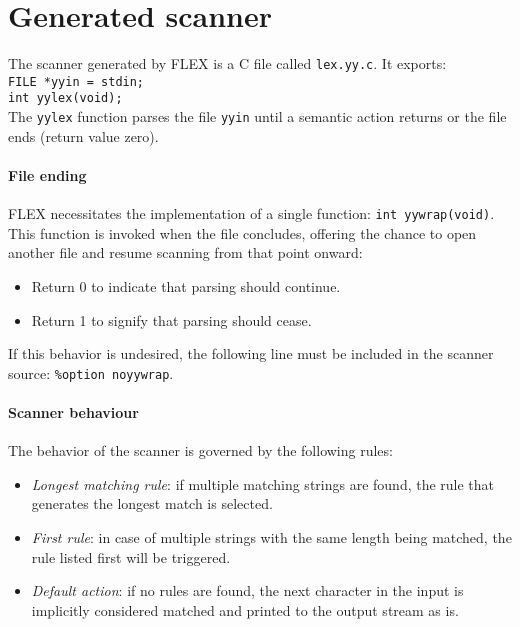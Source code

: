 \section{Generated scanner}

The scanner generated by FLEX is a C file called \texttt{lex.yy.c}. 
It exports: \\ 
\texttt{FILE *yyin = stdin;} \\
\texttt{int yylex(void);} \\
The \texttt{yylex} function parses the file \texttt{yyin} until a semantic action returns or the file ends (return value zero). 

\paragraph*{File ending}
FLEX necessitates the implementation of a single function: \texttt{int yywrap(void)}. 
This function is invoked when the file concludes, offering the chance to open another file and resume scanning from that point onward: 
\begin{itemize}
    \item Return 0 to indicate that parsing should continue.
    \item Return 1 to signify that parsing should cease.
\end{itemize}
If this behavior is undesired, the following line must be included in the scanner source: 
\texttt{\%option noyywrap}.

\paragraph*{Scanner behaviour}

The behavior of the scanner is governed by the following rules:
\begin{itemize}
    \item \textit{Longest matching rule}: if multiple matching strings are found, the rule that generates the longest match is selected.
    \item \textit{First rule}: in case of multiple strings with the same length being matched, the rule listed first will be triggered.
    \item \textit{Default action}: if no rules are found, the next character in the input is implicitly considered matched and printed to the output stream as is.
\end{itemize}

